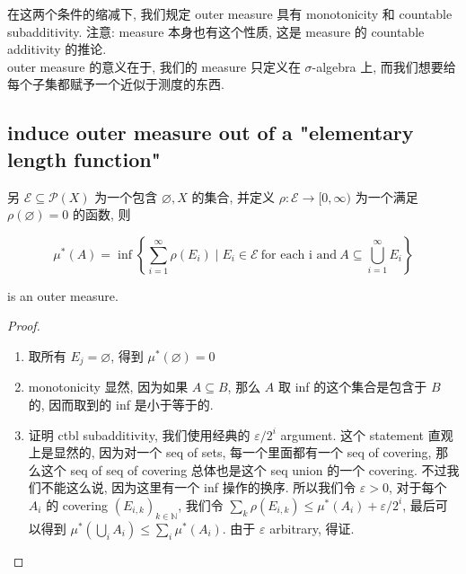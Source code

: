 在这两个条件的缩减下, 我们规定 outer measure 具有 monotonicity 和 countable subadditivity. 注意: measure 本身也有这个性质, 这是 measure 的 countable additivity 的推论.\\
outer measure 的意义在于, 我们的 measure 只定义在 \(\sigma\)-algebra 上, 而我们想要给每个子集都赋予一个近似于测度的东西.

\subsection{induce outer measure out of a "elementary length function"}\label{induce-outer-measure-out-of-a-elementary-length-function}

\begin{theorem}{}\label{thm-02-outer-measure-completion-of-a-measurable-space-construct-outer-measure-out-of-an-elementary-length-function}

另 \(\mathcal{E} \subseteq \mathcal{P}(X)\) 为一个包含 \(\varnothing,X\) 的集合, 并定义 \(\rho:\mathcal{E}\rightarrow\lbrack 0,\infty)\) 为一个满足 \(\rho(\varnothing) = 0\) 的函数, 则

\[\mu^{\ast}(A) = \inf\left\{ {\sum\limits_{i = 1}^{\infty}\rho(E_{i}) \mid E_{i} \in \mathcal{E}\ \text{for each i and}\ A \subseteq \bigcup\limits_{i = 1}^{\infty}E_{i}} \right\}\]

is an outer measure.

\end{theorem}

\begin{proof}

\begin{enumerate}
\item
  取所有 \(E_{j} = \varnothing\), 得到 \(\mu^{\ast}(\varnothing) = 0\)
\item
  monotonicity 显然, 因为如果 \(A \subseteq B\), 那么 \(A\) 取 inf 的这个集合是包含于 \(B\) 的, 因而取到的 inf 是小于等于的.
\item
  证明 ctbl subadditivity, 我们使用经典的 \(\varepsilon/2^{i}\) argument. 这个 statement 直观上是显然的, 因为对一个 seq of sets, 每一个里面都有一个 seq of covering, 那么这个 seq of seq of covering 总体也是这个 seq union 的一个 covering. 不过我们不能这么说, 因为这里有一个 inf 操作的换序. 所以我们令 \(\varepsilon > 0\), 对于每个 \(A_{i}\) 的 covering \((E_{i,k})_{k \in \mathbb{N}}\), 我们令 \(\sum_{k}\rho(E_{i,k}) \leq \mu^{\ast}(A_{i}) + \varepsilon/2^{i}\), 最后可以得到 \(\mu^{\ast}(\bigcup_{i}A_{i}) \leq \sum_{i}\mu^{\ast}(A_{i})\). 由于 \(\varepsilon\) arbitrary, 得证.
\end{enumerate}

\end{proof}

